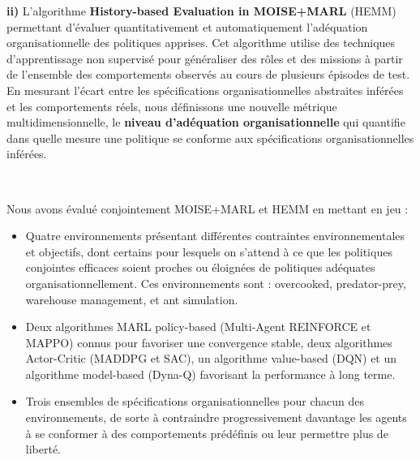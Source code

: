 \documentclass[sigconf,anonymous]{aamas}
\begin{document}
\quad \textbf{ii)} L'algorithme \textbf{History-based Evaluation in MOISE+MARL} (HEMM) permettant d'évaluer quantitativement et automatiquement l'adéquation organisationnelle des politiques apprises. Cet algorithme utilise des techniques d'apprentissage non supervisé pour généraliser des rôles et des missions à partir de l'ensemble des comportements observés au cours de plusieurs épisodes de test. En mesurant l'écart entre les spécifications organisationnelles abstraites inférées et les comportements réels, nous définissons une nouvelle métrique multidimensionnelle, le \textbf{niveau d'adéquation organisationnelle} qui quantifie dans quelle mesure une politique se conforme aux spécifications organisationnelles inférées.

\

\noindent Nous avons évalué conjointement MOISE+MARL et HEMM en mettant en jeu :
\begin{itemize}
  \item Quatre environnements présentant différentes contraintes environnementales et objectifs, dont certains pour lesquels on s'attend à ce que les politiques conjointes efficaces soient proches ou éloignées de politiques adéquates organisationnellement. Ces environnements sont : overcooked, predator-prey, warehouse management, et ant simulation.
  \item Deux algorithmes MARL policy-based (Multi-Agent REINFORCE et MAPPO) connus pour favoriser une convergence stable, deux algorithmes Actor-Critic (MADDPG et SAC), un algorithme value-based (DQN) et un algorithme model-based (Dyna-Q) favorisant la performance à long terme.
  \item Trois ensembles de spécifications organisationnelles pour chacun des environnements, de sorte à contraindre progressivement davantage les agents à se conformer à des comportements prédéfinis ou leur permettre plus de liberté.
\end{itemize}
\end{document}
